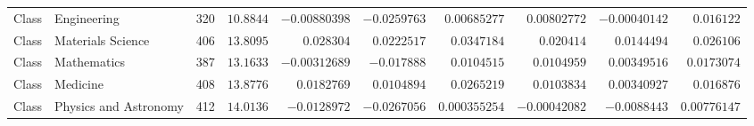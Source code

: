 \begin{tabular}{llrrrrrrrr}
Class & Engineering & 320 & $10.8844$ & $-0.00880398$ & $-0.0259763$ & $0.00685277$ & $0.00802772$ & $-0.00040142$ & $0.016122$ \\
Class & Materials Science & 406 & $13.8095$ & $0.028304$ & $0.0222517$ & $0.0347184$ & $0.020414$ & $0.0144494$ & $0.026106$ \\
Class & Mathematics & 387 & $13.1633$ & $-0.00312689$ & $-0.017888$ & $0.0104515$ & $0.0104959$ & $0.00349516$ & $0.0173074$ \\
Class & Medicine & 408 & $13.8776$ & $0.0182769$ & $0.0104894$ & $0.0265219$ & $0.0103834$ & $0.00340927$ & $0.016876$ \\
Class & Physics and Astronomy & 412 & $14.0136$ & $-0.0128972$ & $-0.0267056$ & $0.000355254$ & $-0.00042082$ & $-0.0088443$ & $0.00776147$ \\
\bottomrule
\end{tabular}
